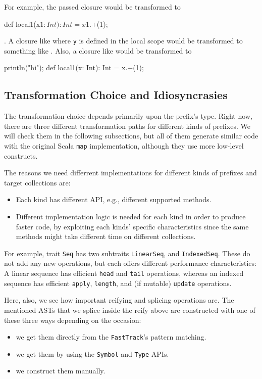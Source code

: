 For example, the passed closure  would be transformed to 
\begin{scalaCode}
def local1(x$1: Int): Int = x$1.+(1);
\end{scalaCode}.
A closure like  where \texttt{y} is defined in the local scope would be
transformed to something like . Also, a closure like  would be transformed to 
\begin{scalaCode}
println("hi");
def local1(x: Int): Int = x.+(1);
\end{scalaCode}

\subsection{Transformation Choice and Idiosyncrasies}

The transformation choice depends primarily upon the prefix's type. Right now,
there are three different transformation paths for different kinds of
prefixes. We will check them in the following subsections, but all of them generate
similar code with the original Scala \texttt{map} implementation, although they use 
more low-level constructs.

The reasons we need differrent implementations for different kinds of
prefixes and target collections are:

\begin{itemize}
 \item
  Each kind has different API, e.g., different supported methods.
 \item
  Different implementation logic is needed for each kind in order to produce
faster code, by exploiting each kinds' specific characteristics since the same
methods might take different time on different collections.
\end{itemize}

For example, trait \texttt{Seq} has two subtraits \texttt{LinearSeq}, and \texttt{IndexedSeq}.
These do not add any new operations, but each offers different performance characteristics: A
linear sequence has efficient \texttt{head} and \texttt{tail} operations, whereas an indexed
sequence has efficient \texttt{apply}, \texttt{length}, and (if mutable) \texttt{update} operations. 

Here, also, we see how important reifying and splicing operations are. The
mentioned ASTs that we splice inside the reify above are constructed with one of
these three ways depending on the occasion:
\begin{itemize}
 \item
  we get them directly from the \texttt{FastTrack}'s pattern matching.
 \item
  we get them by using the \texttt{Symbol} and \texttt{Type} APIs.
 \item
  we construct them manually.
\end{itemize}

